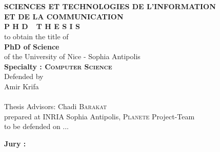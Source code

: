 \begin{titlepage}
\begin{center}
 \\
\vspace*{0.3cm}
 \\
\noindent \textbf{SCIENCES ET TECHNOLOGIES DE L'INFORMATION \\ ET DE LA COMMUNICATION} \\
\vspace*{0.5cm}
\noindent \Huge \textbf{P H D\ \ T H E S I S} \\
\vspace*{0.3cm}
\noindent \large {to obtain the title of} \\
\vspace*{0.3cm}
\noindent \LARGE \textbf{PhD of Science} \\
\vspace*{0.3cm}
\noindent \Large of the University of Nice - Sophia Antipolis \\
\noindent \Large \textbf{Specialty : \textsc{Computer Science}}\\
\vspace*{0.4cm}
\noindent \large {Defended by\\}
\noindent \LARGE Amir Krifa \\
\vspace*{0.8cm}
 \\
\vspace*{0.8cm}
\noindent \Large Thesis Advisors: Chadi \textsc{Barakat} \\
\vspace*{0.2cm}
\noindent \Large prepared at INRIA Sophia Antipolis, \textsc{Planete} Project-Team\\
\vspace*{0.2cm}
\noindent \large to be defended on ... \\
\vspace*{0.5cm}
\end{center}
\noindent \large \textbf{Jury :} \\


\end{titlepage}
\sloppy

\titlepage